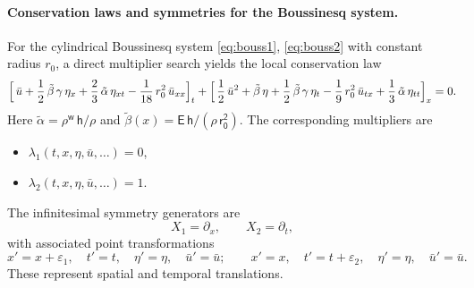 \documentclass[alpha-refs, 12pt]{wiley-article}
\newcommand{\eps}{\varepsilon}
\begin{document}
\paragraph{Conservation laws and symmetries for the Boussinesq system.}

For the cylindrical Boussinesq system \eqref{eq:bouss1}, \eqref{eq:bouss2} with constant radius $r_{0}$, a direct multiplier search yields the local conservation law
\begin{multline}
  \Bigl[\,\bar{u}
         +\frac{1}{2}\,\tilde{\beta}\,\gamma\,\eta_{x}
         +\frac{2}{3}\,\tilde{\alpha}\,\eta_{xt}
         -\frac{1}{18}\,r_{0}^{2}\,\bar{u}_{xx}\Bigr]_{t}
  +\Bigl[\,\frac{1}{2}\,\bar{u}^{2}
        +\tilde{\beta}\,\eta
        +\frac{1}{2}\,\tilde{\beta}\,\gamma\,\eta_{t}
        -\frac{1}{9}\,r_{0}^{2}\,\bar{u}_{tx}
        +\frac{1}{3}\,\tilde{\alpha}\,\eta_{tt}\Bigr]_{x}=0 .
\end{multline}
Here $\tilde{\alpha}= \mathsf{\rho^{w}\,h/\rho}$ and
$\tilde{\beta}(x)=\mathsf{E\,h/(\rho\,r_{0}^{2})}$.
The corresponding multipliers are
\begin{itemize}
  \item $\lambda_{1}(t,x,\eta,\bar{u},\dots)=0$,
  \item $\lambda_{2}(t,x,\eta,\bar{u},\dots)=1$.
\end{itemize}

The infinitesimal symmetry generators are
\[
  X_{1}=\partial_{x},
  \qquad
  X_{2}=\partial_{t},
\]
with associated point transformations
\[
  x' = x+\eps_{1},
  \quad
  t' = t,
  \quad
  \eta'=\eta,
  \quad
  \bar{u}'=\bar{u};
  \qquad
  x' = x,
  \quad
  t' = t+\eps_{2},
  \quad
  \eta'=\eta,
  \quad
  \bar{u}'=\bar{u}.
\]
These represent spatial and temporal translations.
\end{document}
